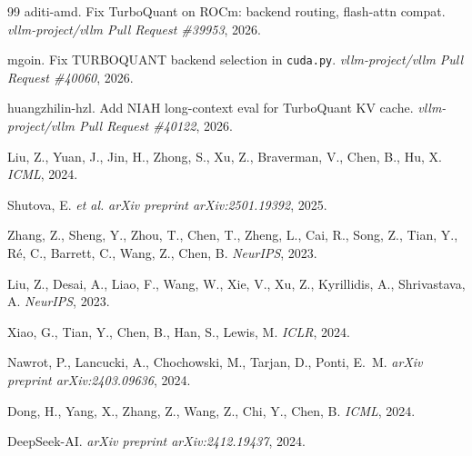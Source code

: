 \documentclass[10pt,a4paper]{article}
\theoremstyle{definition}
\theoremstyle{plain}
\begin{document}
\begin{thebibliography}{99}
aditi-amd.
\newblock [ROCm] Fix TurboQuant on ROCm: backend routing, flash-attn compat.
\newblock \emph{vllm-project/vllm Pull Request \#39953}, 2026.

mgoin.
\newblock Fix TURBOQUANT backend selection in \texttt{cuda.py}.
\newblock \emph{vllm-project/vllm Pull Request \#40060}, 2026.

huangzhilin-hzl.
\newblock [TurboQuant] Add NIAH long-context eval for TurboQuant KV cache.
\newblock \emph{vllm-project/vllm Pull Request \#40122}, 2026.

Liu, Z., Yuan, J., Jin, H., Zhong, S., Xu, Z., Braverman, V., Chen, B., Hu, X.
\newblock \emph{ICML}, 2024.

Shutova, E. \emph{et al.}
\newblock \emph{arXiv preprint arXiv:2501.19392}, 2025.

Zhang, Z., Sheng, Y., Zhou, T., Chen, T., Zheng, L., Cai, R., Song, Z., Tian, Y., R\'e, C., Barrett, C., Wang, Z., Chen, B.
\newblock \emph{NeurIPS}, 2023.

Liu, Z., Desai, A., Liao, F., Wang, W., Xie, V., Xu, Z., Kyrillidis, A., Shrivastava, A.
\newblock \emph{NeurIPS}, 2023.

Xiao, G., Tian, Y., Chen, B., Han, S., Lewis, M.
\newblock \emph{ICLR}, 2024.

Nawrot, P., Lancucki, A., Chochowski, M., Tarjan, D., Ponti, E.~M.
\newblock \emph{arXiv preprint arXiv:2403.09636}, 2024.

Dong, H., Yang, X., Zhang, Z., Wang, Z., Chi, Y., Chen, B.
\newblock \emph{ICML}, 2024.

DeepSeek-AI.
\newblock \emph{arXiv preprint arXiv:2412.19437}, 2024.


\end{thebibliography}
\end{document}
